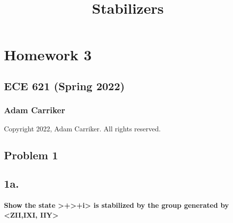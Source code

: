 \documentclass[11pt]{article}
\title{Stabilizers}
\begin{document}
    
    \maketitle
    
    

    
    \hypertarget{homework-3}{%
\section{Homework 3}\label{homework-3}}

\hypertarget{ece-621-spring-2022}{%
\subsection{ECE 621 (Spring 2022)}\label{ece-621-spring-2022}}

\hypertarget{adam-carriker}{%
\subsubsection{Adam Carriker}\label{adam-carriker}}

Copyright 2022, Adam Carriker. All rights reserved.

    \hypertarget{problem-1}{%
\subsection{Problem 1}\label{problem-1}}

    \hypertarget{a.}{%
\subsection{1a.}\label{a.}}

\hypertarget{show-the-state-0i-is-stabilized-by-the-group-generated-by-ziiixi-iiy}{%
\paragraph{Show the state
\textgreater\textbar+\textgreater\textbar+i\textgreater{} is
stabilized by the group generated by \textless ZII,IXI,
IIY\textgreater{}}\label{show-the-state-0i-is-stabilized-by-the-group-generated-by-ziiixi-iiy}}
\end{document}
